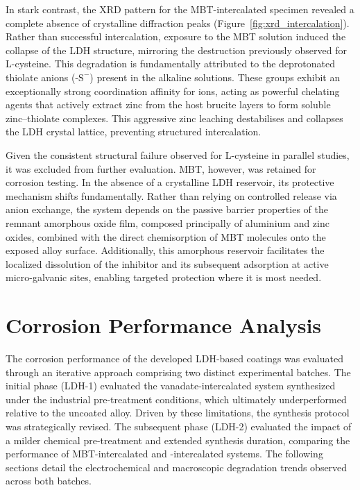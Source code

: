 \documentclass[11pt,twoside,a4paper,final]{report}
\begin{document}
In stark contrast, the XRD pattern for the MBT-intercalated specimen revealed a complete absence of crystalline diffraction peaks (Figure~\ref{fig:xrd_intercalation}). Rather than successful intercalation, exposure to the MBT solution induced the collapse of the LDH structure, mirroring the destruction previously observed for L-cysteine. This degradation is fundamentally attributed to the deprotonated thiolate anions ($\text{-S}^-$) present in the alkaline solutions. These groups exhibit an exceptionally strong coordination affinity for  ions, acting as powerful chelating agents that actively extract zinc from the host brucite layers to form soluble zinc--thiolate complexes. This aggressive zinc leaching destabilises and collapses the LDH crystal lattice, preventing structured intercalation.

Given the consistent structural failure observed for L-cysteine in parallel studies, it was excluded from further evaluation. MBT, however, was retained for corrosion testing. In the absence of a crystalline LDH reservoir, its protective mechanism shifts fundamentally. Rather than relying on controlled release via anion exchange, the system depends on the passive barrier properties of the remnant amorphous oxide film, composed principally of aluminium and zinc oxides, combined with the direct chemisorption of MBT molecules onto the exposed alloy surface. Additionally, this amorphous reservoir facilitates the localized dissolution of the inhibitor and its subsequent adsorption at active micro-galvanic sites, enabling targeted protection where it is most needed.


\section{Corrosion Performance Analysis}
\label{sec:results_corrosion_performance}

The corrosion performance of the developed LDH-based coatings was evaluated through an iterative approach comprising two distinct experimental batches. The initial phase (LDH-1) evaluated the vanadate-intercalated system synthesized under the industrial pre-treatment conditions, which ultimately underperformed relative to the uncoated alloy. Driven by these limitations, the synthesis protocol was strategically revised. The subsequent phase (LDH-2) evaluated the impact of a milder chemical pre-treatment and extended synthesis duration, comparing the performance of MBT-intercalated and -intercalated systems. The following sections detail the electrochemical and macroscopic degradation trends observed across both batches.
\end{document}
